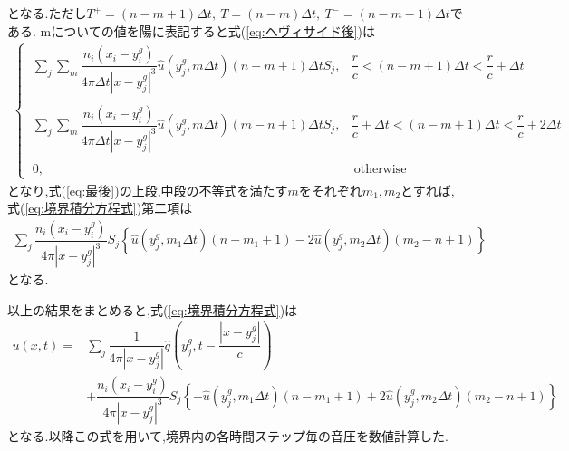 \documentclass[dvipdfmx]{ampbt}
\begin{document}
となる.ただし$T^+ =(n-m+1)\Delta t,\ T =(n-m)\Delta t,\ T^- =(n-m-1)\Delta t$である.
mについての値を陽に表記すると式(\ref{eq:ヘヴィサイド後})は
\begin{align}
\begin{cases}
  \label{eq:最後}
\; \displaystyle\sum_j \sum_m \dfrac{n_i(x_i-y^g_i)}{4\pi \Delta t |x-y^g_j|^3}  \hat{u}(y^g_j,m\Delta t)(n-m+1)\Delta t S_j, &\dfrac{r}{c} < (n-m+1)\Delta t < \dfrac{r}{c}+\Delta t \\  \\
\; \displaystyle\sum_j \sum_m \dfrac{n_i(x_i-y^g_i)}{4\pi \Delta t |x-y^g_j|^3}  \hat{u}(y^g_j,m\Delta t)(m-n+1)\Delta t S_j, &\dfrac{r}{c}+\Delta t < (n-m+1)\Delta t < \dfrac{r}{c}+2\Delta t\\  \\
\; 0, &\ \mbox{otherwise}
\end{cases}
\end{align}
となり,式(\ref{eq:最後})の上段,中段の不等式を満たす$m$をそれぞれ$m_1,m_2$とすれば,式(\ref{eq:境界積分方程式})第二項は
\begin{align}
\label{eq:最後の最後}
\displaystyle\sum_j \dfrac{n_i(x_i-y^g_i)}{4\pi |x-y^g_j|^3} S_j \left\{  \hat{u}(y^g_j,m_1\Delta t)(n-m_1+1)
-2 \hat{u}(y^g_j,m_2\Delta t)(m_2-n+1)\right\}
\end{align}
となる.\par
以上の結果をまとめると,式(\ref{eq:境界積分方程式})は
\begin{align}
\label{eq:境界積分方程式の変形後}
u(x,t) = &\sum_j  \dfrac{1}{4\pi|x-y_j^g|} \hat{q}(y_j^g,t-\dfrac{|x-y_j^g|}{c}) \nonumber\\
 &+ \dfrac{n_i(x_i-y^g_i)}{4\pi |x-y^g_j|^3} S_j \left\{  -\hat{u}(y^g_j,m_1\Delta t)(n-m_1+1)
 +2 \hat{u}(y^g_j,m_2\Delta t)(m_2-n+1)\right\}
\end{align}
となる.以降この式を用いて,境界内の各時間ステップ毎の音圧を数値計算した.
\end{document}
